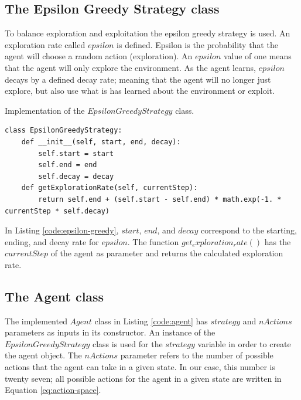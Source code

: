 \documentclass[12pt,oneside]{article}
\begin{document}
\subsection{The Epsilon Greedy Strategy class}
To balance exploration and exploitation the epsilon greedy strategy is used. An exploration rate called $epsilon$ is defined. Epsilon is the probability that the agent will choose a random action (exploration). An $epsilon$ value of one means that the agent will only explore the environment. As the agent learns, $epsilon$ decays by a defined decay rate;  meaning that the agent will no longer just explore, but also use what is has learned about the environment or exploit.
\begin{listing}[H]
\caption{Implementation of the $EpsilonGreedyStrategy$ class.}
\label{code:epsilon-greedy}
\begin{tcolorbox}[]
\begin{verbatim}
class EpsilonGreedyStrategy:
    def __init__(self, start, end, decay):
        self.start = start
        self.end = end
        self.decay = decay
    def getExplorationRate(self, currentStep):
        return self.end + (self.start - self.end) * math.exp(-1. * currentStep * self.decay)
\end{verbatim}
\end{tcolorbox}
\end{listing} 
In Listing \ref{code:epsilon-greedy}, $start$, $end$, and $decay$ correspond to the starting, ending, and decay rate for $epsilon$. The function $get_exploration_rate()$ has the $currentStep$ of the agent as parameter and returns the calculated exploration rate.

\subsection{The Agent class}
The implemented $Agent$ class in Listing \ref{code:agent} has $strategy$ and $nActions$ parameters as inputs in its constructor. An instance of the $EpsilonGreedyStrategy$ class is used for the $strategy$ variable in order to create the agent object. The $nActions$ parameter refers to the number of possible actions that the agent can take in a given state. In our case, this number is twenty seven; all possible actions for the agent in a given state are written in Equation \ref{eq:action-space}.
\end{document}
